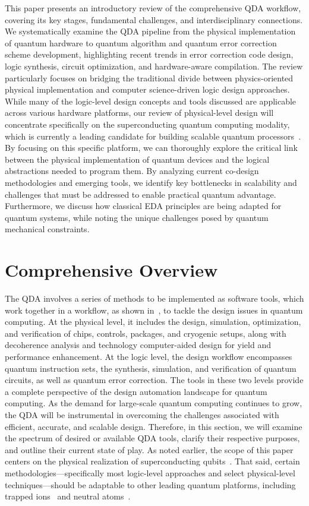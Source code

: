 \documentclass[a4paper,onecolumn,11pt,unpublished]{quantumarticle}
\begin{document}
This paper presents an introductory review of the comprehensive QDA workflow, covering its key stages, fundamental challenges, and interdisciplinary connections. 
We systematically examine the QDA pipeline from the physical implementation of quantum hardware to quantum algorithm and quantum error correction scheme development, highlighting recent trends in error correction code design, logic synthesis, circuit optimization, and hardware-aware compilation. 
The review particularly focuses on bridging the traditional divide between physics-oriented physical implementation and computer science-driven logic design approaches. 
While many of the logic-level design concepts and tools discussed are applicable across various hardware platforms, our review of physical-level design will concentrate specifically on the superconducting quantum computing modality, which is currently a leading candidate for building scalable quantum processors~\cite{Kjaergaard2020}.
By focusing on this specific platform, we can thoroughly explore the critical link between the physical implementation of quantum devices and the logical abstractions needed to program them.
By analyzing current co-design methodologies and emerging tools, we identify key bottlenecks in scalability and challenges that must be addressed to enable practical quantum advantage. Furthermore, we discuss how classical EDA principles are being adapted for quantum systems, while noting the unique challenges posed by quantum mechanical constraints.



\section{Comprehensive Overview}

The QDA involves a series of methods to be implemented as software tools, which work together in a workflow, as shown in~, to tackle the design issues in quantum computing. 
At the physical level, it includes the design, simulation, optimization, and verification of chips, controls, packages, and cryogenic setups, along with decoherence analysis and technology computer-aided design for yield and performance enhancement.
At the logic level, the design workflow encompasses quantum instruction sets, the synthesis, simulation, and verification of quantum circuits, as well as quantum error correction.
The tools in these two levels provide a complete perspective of the design automation landscape for quantum computing.
As the demand for large-scale quantum computing continues to grow, the QDA will be instrumental in  overcoming the challenges associated with efficient, accurate, and scalable design.
Therefore, in this section, we will examine the spectrum of desired or available QDA tools, clarify their respective purposes, and outline their current state of play. As noted earlier, the scope of this paper centers on the physical realization of superconducting qubits~\cite{Krantz2019A}. That said, certain methodologies---specifically most logic-level approaches and select physical-level techniques---should be adaptable to other leading quantum platforms, including trapped ions~\cite{bruzewicz2019trapped} and neutral atoms~\cite{adams2019rydberg, saffman2010quantum, wu2021concise}.
\end{document}
